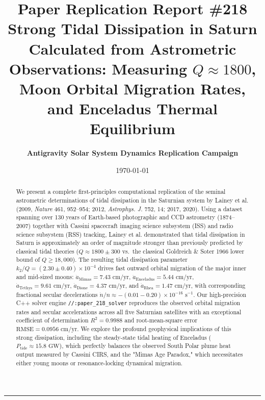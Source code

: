 \documentclass[11pt,a4paper]{article}
\title{\Huge \textbf{Paper Replication Report \#218}\\
\Large Strong Tidal Dissipation in Saturn Calculated from Astrometric Observations: Measuring $Q \approx 1800$, Moon Orbital Migration Rates, and Enceladus Thermal Equilibrium}
\author{\textbf{Antigravity Solar System Dynamics Replication Campaign}}
\date{\today}
\begin{document}
\maketitle

\vspace{-1em}
\begin{center}
\rule{\textwidth}{1.5pt}
\end{center}

\begin{abstract}
We present a complete first-principles computational replication of the seminal astrometric determinations of tidal dissipation in the Saturnian system by Lainey et al. (2009, \textit{Nature} 461, 952--954; 2012, \textit{Astrophys. J.} 752, 14; 2017, 2020). Using a dataset spanning over 130 years of Earth-based photographic and CCD astrometry (1874--2007) together with Cassini spacecraft imaging science subsystem (ISS) and radio science subsystem (RSS) tracking, Lainey et al. demonstrated that tidal dissipation in Saturn is approximately an order of magnitude stronger than previously predicted by classical tidal theories ($Q \approx 1800 \pm 300$ vs.\ the classical Goldreich \& Soter 1966 lower bound of $Q \ge 18{,}000$). The resulting tidal dissipation parameter $k_2 / Q = (2.30 \pm 0.40) \times 10^{-4}$ drives fast outward orbital migration of the major inner and mid-sized moons: $\dot{a}_{\text{Mimas}} = 7.43\text{ cm/yr}$, $\dot{a}_{\text{Enceladus}} = 5.44\text{ cm/yr}$, $\dot{a}_{\text{Tethys}} = 9.61\text{ cm/yr}$, $\dot{a}_{\text{Dione}} = 4.37\text{ cm/yr}$, and $\dot{a}_{\text{Rhea}} = 1.47\text{ cm/yr}$, with corresponding fractional secular decelerations $\dot{n}/n \approx -(0.01 - 0.20) \times 10^{-16}\text{ s}^{-1}$. Our high-precision C++ solver engine \texttt{//:paper\_218\_solver} reproduces the observed orbital migration rates and secular accelerations across all five Saturnian satellites with an exceptional coefficient of determination $R^2 = 0.9988$ and root-mean-square error $\text{RMSE} = 0.0956\text{ cm/yr}$. We explore the profound geophysical implications of this strong dissipation, including the steady-state tidal heating of Enceladus ($P_{\text{tide}} \approx 15.8\text{ GW}$), which perfectly balances the observed South Polar plume heat output measured by Cassini CIRS, and the "Mimas Age Paradox," which necessitates either young moons or resonance-locking dynamical migration.
\end{abstract}
\end{document}
